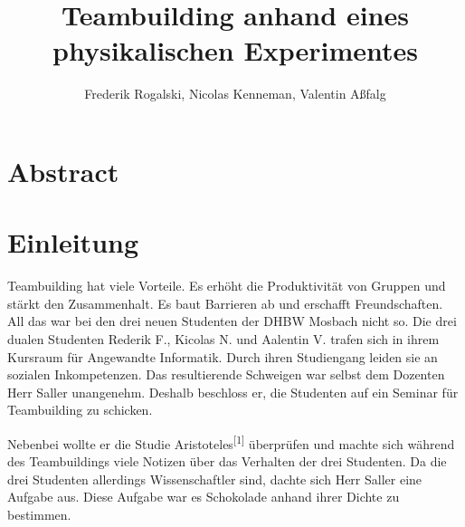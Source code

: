 \documentclass[12pt]{scrartcl}
\title{Teambuilding anhand eines physikalischen Experimentes}
\author{Frederik Rogalski, Nicolas Kenneman, Valentin Aßfalg}
\begin{document}
\maketitle

\section{Abstract}

\section{Einleitung}
Teambuilding hat viele Vorteile. Es erhöht die Produktivität von Gruppen und stärkt den Zusammenhalt. Es baut Barrieren ab und erschafft Freundschaften. All das war bei den drei neuen Studenten der DHBW Mosbach nicht so. Die drei dualen Studenten Rederik F., Kicolas N. und Aalentin V. trafen sich in ihrem Kursraum für Angewandte Informatik. Durch ihren Studiengang leiden sie an sozialen Inkompetenzen. Das resultierende Schweigen war selbst dem Dozenten Herr Saller unangenehm. Deshalb beschloss er, die Studenten auf ein Seminar für Teambuilding zu schicken. 

Nebenbei wollte er die Studie Aristoteles\textsuperscript {[1]} überprüfen und machte sich während des Teambuildings viele Notizen über das Verhalten der drei Studenten. Da die drei Studenten allerdings Wissenschaftler sind, dachte sich Herr Saller eine Aufgabe aus. Diese Aufgabe war es Schokolade anhand ihrer Dichte zu bestimmen.
\end{document}
